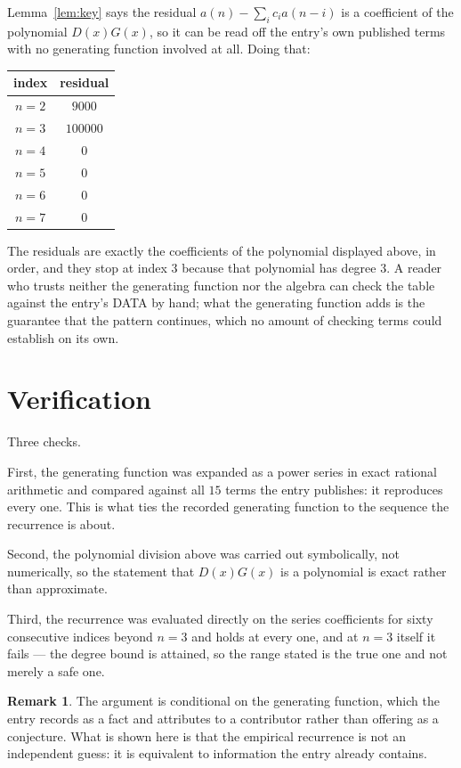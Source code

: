 \documentclass[11pt,a4paper]{article}
\theoremstyle{plain}
\theoremstyle{definition}
\newtheorem{remark}[theorem]{Remark}
\begin{document}
Lemma~\ref{lem:key} says the residual $a(n)-\sum_ic_ia(n-i)$ is a coefficient of the
polynomial $D(x)G(x)$, so it can be read off the entry's own published terms with no
generating function involved at all. Doing that:
\begin{center}
\begin{tabular}{cc}
index & residual \\ \hline
$n=2$ & $9000$ \\
$n=3$ & $100000$ \\
$n=4$ & $0$ \\
$n=5$ & $0$ \\
$n=6$ & $0$ \\
$n=7$ & $0$
\end{tabular}
\end{center}
The residuals are exactly the coefficients of the polynomial displayed above, in order, and
they stop at index $3$ because that polynomial has degree $3$. A reader who trusts
neither the generating function nor the algebra can check the table against the entry's DATA
by hand; what the generating function adds is the guarantee that the pattern continues, which
no amount of checking terms could establish on its own.

\section{Verification}

Three checks.

First, the generating function was expanded as a power series in exact rational arithmetic and
compared against all $15$ terms the entry publishes: it reproduces every one. This is
what ties the recorded generating function to the sequence the recurrence is about.

Second, the polynomial division above was carried out symbolically, not numerically, so the
statement that $D(x)G(x)$ is a polynomial is exact rather than approximate.

Third, the recurrence was evaluated directly on the series coefficients for sixty consecutive
indices beyond $n=3$ and holds at every one, and at $n=3$ itself it fails --- the
degree bound is attained, so the range stated is the true one and not merely a safe one.

\begin{remark}
The argument is conditional on the generating function, which the entry records as a fact and
attributes to a contributor rather than offering as a conjecture. What is shown here is that
the empirical recurrence is not an independent guess: it is equivalent to information the
entry already contains.
\end{remark}
\end{document}
